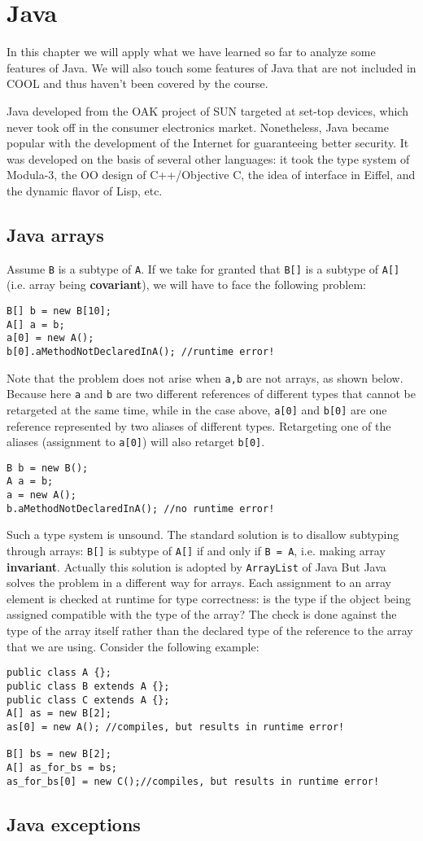 \ifx\PREAMBLE\undefined


\fi
\chapter{Java}
In this chapter we will apply what we have learned so far to analyze some features of Java. We will also touch some features of Java that are not included in COOL and thus haven't been covered by the course.

Java developed from the OAK project of SUN targeted at set-top devices, which never took off in the consumer electronics market. Nonetheless, Java became popular with the development of the Internet for guaranteeing better security. It was developed on the basis of several other languages: it took the type system of Modula-3, the OO design of C++/Objective C, the idea of interface in Eiffel, and the dynamic flavor of Lisp, etc. 
\section{Java arrays}
Assume \texttt{B} is a subtype of \texttt{A}. If we take for granted that \texttt{B[]} is a subtype of \texttt{A[]} (i.e. array being \textbf{covariant}), we will have to face the following problem:
\begin{lstlisting}
B[] b = new B[10];
A[] a = b;
a[0] = new A();
b[0].aMethodNotDeclaredInA(); //runtime error!
\end{lstlisting}
Note that the problem does not arise when \texttt{a,b} are not arrays, as shown below. Because here \texttt{a} and \texttt{b} are two different references of different types that cannot be retargeted at the same time, while in the case above, \texttt{a[0]} and \texttt{b[0]} are one reference represented by two aliases of different types. Retargeting one of the aliases (assignment to \texttt{a[0]}) will also retarget \texttt{b[0]}. 
\begin{lstlisting}
B b = new B();
A a = b;
a = new A();
b.aMethodNotDeclaredInA(); //no runtime error!
\end{lstlisting}

Such a type system is unsound. The standard solution is to disallow subtyping through arrays: \texttt{B[]} is subtype of \texttt{A[]} if and only if \texttt{B = A}, i.e. making array \textbf{invariant}. Actually this solution is adopted by \texttt{ArrayList} of Java But Java solves the problem in a different way for arrays. Each assignment to an array element is checked at runtime for type correctness: is the type if the object being assigned compatible with the type of the array? The check is done against the type of the array itself rather than the declared type of the reference to the array that we are using. Consider the following example:
\begin{lstlisting}
public class A {};
public class B extends A {};
public class C extends A {};
A[] as = new B[2];
as[0] = new A(); //compiles, but results in runtime error!

B[] bs = new B[2];
A[] as_for_bs = bs;
as_for_bs[0] = new C();//compiles, but results in runtime error!
\end{lstlisting}
\section{Java exceptions}
\ifx\PREAMBLE\undefined

\fi